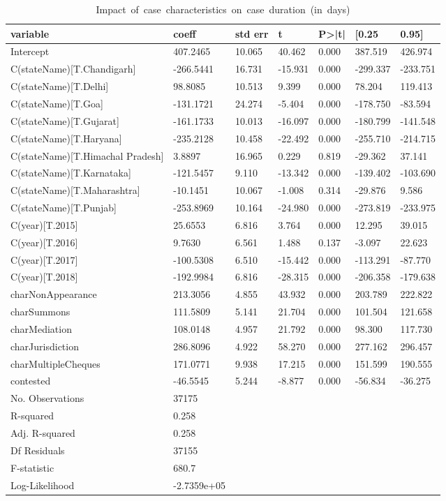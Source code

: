 {\footnotesize
  \begin{longtable}{@{}lllllll@{}}
\caption{\mbox{Impact of case characteristics on case duration (in days)}}
\label{tab:duration_reg}\\
\toprule
variable & coeff & std err & t & P>|t| & [0.25 & 0.95] \\\midrule
\endhead
Intercept & 407.2465 & 10.065 & 40.462 & 0.000 & 387.519 & 426.974 \\
C(stateName)[T.Chandigarh] & -266.5441 & 16.731 & -15.931 & 0.000 & -299.337 & -233.751 \\
C(stateName)[T.Delhi] & 98.8085 & 10.513 & 9.399 & 0.000 & 78.204 & 119.413 \\
C(stateName)[T.Goa] & -131.1721 & 24.274 & -5.404 & 0.000 & -178.750 & -83.594 \\
C(stateName)[T.Gujarat] & -161.1733 & 10.013 & -16.097 & 0.000 & -180.799 & -141.548 \\
C(stateName)[T.Haryana] & -235.2128 & 10.458 & -22.492 & 0.000 & -255.710 & -214.715 \\
C(stateName)[T.Himachal Pradesh] & 3.8897 & 16.965 & 0.229 & 0.819 & -29.362 & 37.141 \\
C(stateName)[T.Karnataka] & -121.5457 & 9.110 & -13.342 & 0.000 & -139.402 & -103.690 \\
C(stateName)[T.Maharashtra] & -10.1451 & 10.067 & -1.008 & 0.314 & -29.876 & 9.586 \\
C(stateName)[T.Punjab] & -253.8969 & 10.164 & -24.980 & 0.000 & -273.819 & -233.975 \\
C(year)[T.2015] & 25.6553 & 6.816 & 3.764 & 0.000 & 12.295 & 39.015 \\
C(year)[T.2016] & 9.7630 & 6.561 & 1.488 & 0.137 & -3.097 & 22.623 \\
C(year)[T.2017] & -100.5308 & 6.510 & -15.442 & 0.000 & -113.291 & -87.770 \\
C(year)[T.2018] & -192.9984 & 6.816 & -28.315 & 0.000 & -206.358 & -179.638 \\
charNonAppearance & 213.3056 & 4.855 & 43.932 & 0.000 & 203.789 & 222.822 \\
charSummons & 111.5809 & 5.141 & 21.704 & 0.000 & 101.504 & 121.658 \\
charMediation & 108.0148 & 4.957 & 21.792 & 0.000 & 98.300 & 117.730 \\
charJurisdiction & 286.8096 & 4.922 & 58.270 & 0.000 & 277.162 & 296.457 \\
charMultipleCheques & 171.0771 & 9.938 & 17.215 & 0.000 & 151.599 & 190.555 \\
contested & -46.5545 & 5.244 & -8.877 & 0.000 & -56.834 & -36.275\\
\bottomrule
No. Observations & 37175 & & & & &\\
R-squared & 0.258 & & & & & \\
Adj. R-squared& 0.258& & & & & \\
Df Residuals& 37155 & & & & &\\
F-statistic & 680.7 & & & & & \\
Log-Likelihood & -2.7359e+05 & & & & & \\
\bottomrule
\end{longtable}}


